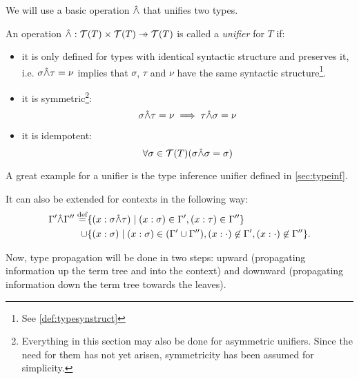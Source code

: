 \documentclass[main.tex]{subfiles}
\begin{document}
We will use a basic operation $\hat{\wedge}$ that unifies two types.

\begin{defn}
    An operation $ \unify : \tclos{T} \times \tclos{T} \pfun \tclos{T}$ is
    called a \emph{unifier} for $T$ if:
    \begin{itemize}
        \item it is only defined for types with identical syntactic structure and
            preserves it, i.e. $\sigma \hat{\wedge} \tau = \nu$ implies that $\sigma$,
            $\tau$ and $\nu$ have the same syntactic structure\footnote{
                See \cref{def:typesynstruct}
            }.

        \item it is symmetric\footnote{
                Everything in this section may also be done for asymmetric unifiers.
                Since the need for them has not yet arisen, symmetricity has been
                assumed for simplicity.
            }:
            \[ \sigma \hat{\wedge} \tau = \nu \implies \tau \hat{\wedge} \sigma = \nu \]

        \item it is idempotent:
            \[ \forall \sigma \in \mathcal{T}( T ) (\sigma \hat{\wedge} \sigma = \sigma) \]
    \end{itemize}
\end{defn}

A great example for a unifier is the type inference unifier defined in
\cref{sec:typeinf}.


It can also be extended for contexts in the following way:
\[
    \begin{split}
        \Gamma' \hat{\wedge} \Gamma'' \overset{\text{\scriptsize def}}{=}
        &\{ (x : \sigma \hat{\wedge} \tau) \mid (x : \sigma) \in \Gamma', (x : \tau) \in \Gamma''\} \\
        \cup &
        \{ (x : \sigma) \mid (x : \sigma) \in (\Gamma' \cup \Gamma''),
            (x : \cdot) \not\in \Gamma',
            (x : \cdot) \not\in \Gamma'' \}. \\
    \end{split}
\]

Now, type propagation will be done in two steps: upward (propagating
information up the term tree and into the context) and downward (propagating
information down the term tree towards the leaves).
\end{document}
